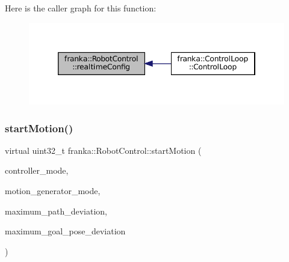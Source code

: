 Here is the caller graph for this function\+:
\nopagebreak
\begin{figure}[H]
\begin{center}
\leavevmode
\includegraphics[width=346pt]{classfranka_1_1RobotControl_aca02c0c27b863d4a42e08d541c400832_icgraph}
\end{center}
\end{figure}
\mbox{\label{classfranka_1_1RobotControl_a4a91a5baea3f7edc7eb094ef8208c065}} 
\subsubsection{\texorpdfstring{start\+Motion()}{startMotion()}}
{\footnotesize\ttfamily virtual uint32\+\_\+t franka\+::\+Robot\+Control\+::start\+Motion (\begin{DoxyParamCaption}\item[{\hyperlink{structresearch__interface_1_1robot_1_1Move_a3e7b80b30bbf01dc902c84402502ebbc}{research\+\_\+interface\+::robot\+::\+Move\+::\+Controller\+Mode}}]{controller\+\_\+mode,  }\item[{\hyperlink{structresearch__interface_1_1robot_1_1Move_a334b8380507154e8042b57fbd3287c0f}{research\+\_\+interface\+::robot\+::\+Move\+::\+Motion\+Generator\+Mode}}]{motion\+\_\+generator\+\_\+mode,  }\item[{const \hyperlink{structresearch__interface_1_1robot_1_1Move_1_1Deviation}{research\+\_\+interface\+::robot\+::\+Move\+::\+Deviation} \&}]{maximum\+\_\+path\+\_\+deviation,  }\item[{const \hyperlink{structresearch__interface_1_1robot_1_1Move_1_1Deviation}{research\+\_\+interface\+::robot\+::\+Move\+::\+Deviation} \&}]{maximum\+\_\+goal\+\_\+pose\+\_\+deviation }\end{DoxyParamCaption})\hspace{0.3cm}{\ttfamily [pure virtual]}}



